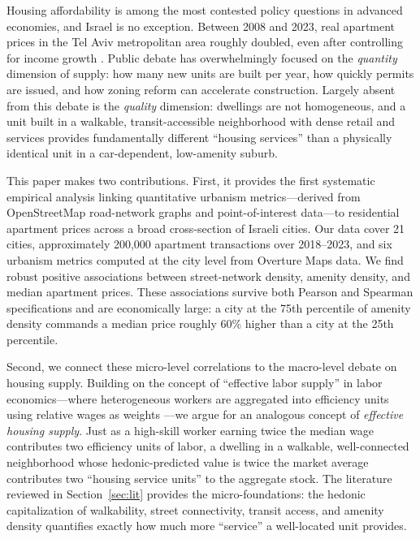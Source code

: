 \documentclass[12pt,a4paper]{article}
\begin{document}
Housing affordability is among the most contested policy questions in advanced
economies, and Israel is no exception.  Between 2008 and 2023, real apartment
prices in the Tel Aviv metropolitan area roughly doubled, even after controlling
for income growth \citep{boi2023housing}.  Public debate has overwhelmingly
focused on the \textit{quantity} dimension of supply: how many new units are
built per year, how quickly permits are issued, and how zoning reform can
accelerate construction.  Largely absent from this debate is the
\textit{quality} dimension: dwellings are not homogeneous, and a unit built in
a walkable, transit-accessible neighborhood with dense retail and services
provides fundamentally different ``housing services'' than a physically
identical unit in a car-dependent, low-amenity suburb.

This paper makes two contributions.  First, it provides the first systematic
empirical analysis linking quantitative urbanism metrics—derived from
OpenStreetMap road-network graphs and point-of-interest data—to residential
apartment prices across a broad cross-section of Israeli cities.  Our data
cover 21 cities, approximately 200,000 apartment transactions over 2018–2023,
and six urbanism metrics computed at the city level from Overture Maps data.
We find robust positive associations between street-network density, amenity
density, and median apartment prices.  These associations survive both Pearson
and Spearman specifications and are economically large: a city at the 75th
percentile of amenity density commands a median price roughly 60\% higher than
a city at the 25th percentile.

Second, we connect these micro-level correlations to the macro-level debate on
housing supply.  Building on the concept of ``effective labor supply'' in labor
economics—where heterogeneous workers are aggregated into efficiency units using
relative wages as weights \citep{katz1992changes}—we argue for an analogous
concept of \textit{effective housing supply}.  Just as a high-skill worker
earning twice the median wage contributes two efficiency units of labor, a
dwelling in a walkable, well-connected neighborhood whose hedonic-predicted
value is twice the market average contributes two ``housing service units'' to
the aggregate stock.  The lit\-erature reviewed in Section~\ref{sec:lit}
provides the micro-foundations: the hedonic capitalization of walkability,
street connectivity, transit access, and amenity density quantifies exactly how
much more ``service'' a well-located unit provides.
\end{document}
